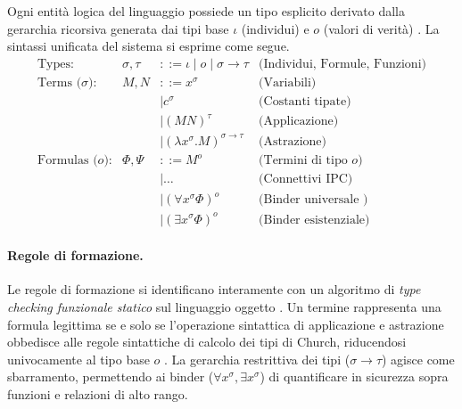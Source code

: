 Ogni entità logica del linguaggio possiede un tipo esplicito derivato dalla gerarchia ricorsiva generata dai tipi base $\iota$ (individui) e 
$o$ (valori di verità) \cite{hindley1997}. La sintassi unificata del sistema si esprime come segue.
\begin{equation}
    \begin{array}{lrll}
        \text{Types:}            & \sigma, \tau & ::= \iota \mid o \mid \sigma \to \tau         & \text{(Individui, Formule, Funzioni)} \\
        \text{Terms ($\sigma$):} & M, N         & ::= x^\sigma  \quad                           & \text{(Variabili)}                    \\
                                 &              & \mid c^\sigma \quad                           & \text{(Costanti tipate)}              \\
                                 &              & \mid (M N)^\tau                               & \text{(Applicazione)}                 \\
                                 &              & \mid (\lambda x^\sigma. M)^{\sigma \to \tau}  & \text{(Astrazione)}                   \\
        \text{Formulas ($o$):}   & \Phi, \Psi   & ::= M^o \quad                                 & \text{(Termini di tipo } o\text{)}    \\
                                 &              & \mid \dots \quad                              & \text{(Connettivi IPC)}               \\
                                 &              & \mid (\forall x^\sigma \Phi)^o \quad          & \text{(Binder universale )}           \\
                                 &              & \mid (\exists x^\sigma \Phi)^o \quad          & \text{(Binder esistenziale)}
    \end{array}
    \tag{IHOL}
    \label{eq:ihol_grammar}
\end{equation}

\paragraph{Regole di formazione.}
Le regole di formazione si identificano interamente con un algoritmo di \emph{type checking funzionale statico} sul linguaggio oggetto \cite{hindley1997}. 
Un termine rappresenta una formula legittima se e solo se l'operazione sintattica di applicazione e astrazione obbedisce alle regole sintattiche di calcolo 
dei tipi di Church, riducendosi univocamente al tipo base $o$ \cite{hindley1997}. La gerarchia restrittiva dei tipi ($\sigma \to \tau$) agisce come sbarramento, 
permettendo ai binder ($\forall x^\sigma, \exists x^\sigma$) di quantificare in sicurezza sopra funzioni e relazioni di alto rango.